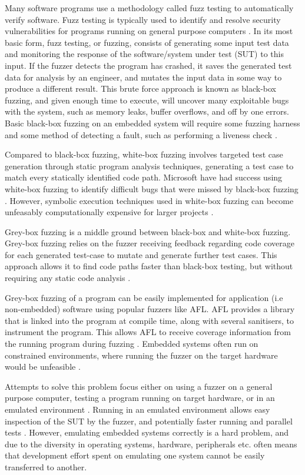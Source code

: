 \documentclass[../report.tex]{subfiles}
\begin{document}
Many software programs use a methodology called fuzz testing to automatically
verify software. Fuzz testing is typically used to identify and resolve
security vulnerabilities for programs running on general purpose computers
\citep{Google_2023}. In its most basic form, fuzz testing, or fuzzing, consists
of generating some input test data and monitoring the response of the
software/system under test (SUT) to this input. If the fuzzer detects the
program has crashed, it saves the generated test data for analysis by an
engineer, and mutates the input data in some way to produce a different result.
This brute force approach is known as black-box fuzzing, and given enough time
to execute, will uncover many exploitable bugs with the system, such as memory
leaks, buffer overflows, and off by one errors. Basic black-box fuzzing on an
embedded system will require some fuzzing harness \citep{Eisele_et_al_2022} and
some method of detecting a fault, such as performing a liveness check
\citep{Yun_2022}.

Compared to black-box fuzzing, white-box fuzzing involves targeted test case
generation through static program analysis techniques, generating a test case
to match every statically identified code path. Microsoft have had success
using white-box fuzzing to identify difficult bugs that were missed by
black-box fuzzing \citep{Godefroid_2012}. However, symbolic execution
techniques used in white-box fuzzing can become unfeasably computationally
expensive for larger projects \citep{Krishnamoorthy_2010}.

Grey-box fuzzing is a middle ground between black-box and white-box fuzzing.
Grey-box fuzzing relies on the fuzzer receiving feedback regarding code
coverage for each generated test-case to mutate and generate further test
cases. This approach allows it to find code paths faster than black-box
testing, but without requiring any static code analysis \citep{Yun_2022}.

Grey-box fuzzing of a program can be easily implemented for application (i.e
non-embedded) software using popular fuzzers like AFL. AFL provides a library
that is linked into the program at compile time, along with several sanitisers,
to instrument the program. This allows AFL to receive coverage information from
the running program during fuzzing \citep{AFL_2019}. Embedded systems often run on
constrained environments, where running the fuzzer on the target hardware would
be unfeasible \citep{Yun_2022}.

Attempts to solve this problem focus either on using a fuzzer on a general
purpose computer, testing a program running on target hardware, or in an
emulated environment \citep{Eisele_et_al_2022}. Running in an emulated
environment allows easy inspection of the SUT by the fuzzer, and potentially
faster running and parallel tests \citep{Eisele_et_al_2022}. However, emulating
embedded systems correctly is a hard problem, and due to the diversity in
operating systems, hardware, peripherals etc. often means that development
effort spent on emulating one system cannot be easily transferred to another.
\end{document}
